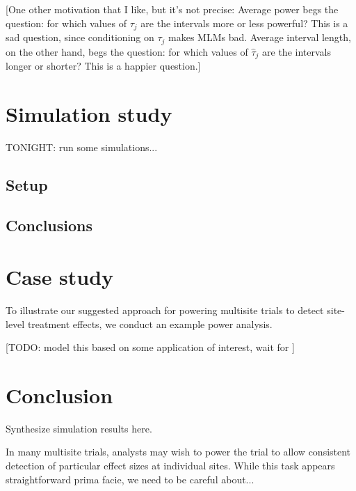 \documentclass[]{article}
\begin{document}
[One other motivation that I like, but it's not precise:
Average power begs the question: for which values of $\tau_j$ are the intervals more or less powerful?
This is a sad question, since conditioning on $\tau_j$ makes MLMs bad.
Average interval length, on the other hand, begs the question: for which values of $\hat{\tau}_j$ are the intervals longer or shorter?
This is a happier question.]


\section{Simulation study}

TONIGHT: run some simulations...

\subsection{Setup}

\subsection{Conclusions}


\section{Case study}

To illustrate our suggested approach for powering multisite trials to detect site-level treatment effects, we conduct an example power analysis.

[TODO: model this based on some application of interest, wait for ]


\section{Conclusion}

Synthesize simulation results here.

In many multisite trials, analysts may wish to power the trial to allow consistent detection of particular effect sizes at individual sites.
While this task appears straightforward prima facie, we need to be careful about...



	
\end{document}

